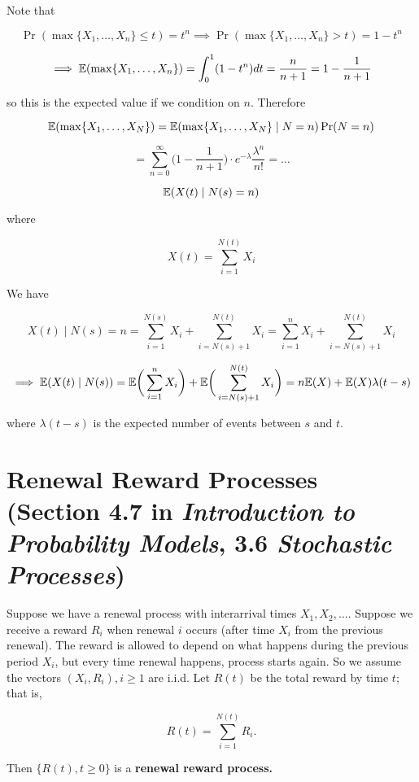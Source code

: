 \begin{solution} Note that 

\[
 \Pr(\max\{X_1, \ldots, X_n\} \leq t) = t^n \implies  \Pr(\max\{X_1, \ldots, X_n\} > t) = 1 - t^n
\]

\[
\implies \mathbb{E}(\max\{X_1, \ldots, X_n\}) = \int_0^1 (1 - t^n ) dt = \frac{n}{n+1} = 1 - \frac{1}{n+1}
\]

so this is the expected value if we condition on \(n\). Therefore

\[
\mathbb{E}( \max\{X_1, \ldots, X_N\}) = \mathbb{E}( \max\{X_1, \ldots, X_N\} \mid N = n) \Pr(N = n) 
\]

\[
=\sum_{n=0}^\infty  \bigg( 1 - \frac{1}{n+1} \bigg) \cdot e^{-\lambda} \frac{\lambda^n}{n!} = \ldots
\]

\end{solution}

\begin{exercise}

\[
\mathbb{E}(X(t) \mid N(s) = n)
\]

where

%

\[
X(t) = \sum_{i=1}^{N(t)} X_i
\]

\end{exercise}

\begin{solution}

We have

\[
X(t) \mid N(s) = n =   \sum_{i=1}^{N(s)} X_i  + \sum_{i=N(s) + 1}^{N(t)} X_i =   \sum_{i=1}^{n} X_i  + \sum_{i=N(s) + 1}^{N(t)} X_i
\]

\[
\implies \mathbb{E}(X(t) \mid N(s)) = \mathbb{E} \bigg(  \sum_{i=1}^{n} X_i  \bigg) + \mathbb{E} \bigg( \sum_{i=N(s) + 1}^{N(t)} X_i \bigg)  = n \mathbb{E}(X) + \mathbb{E} (X) \lambda(t-s)
\]

where \(\lambda(t-s)\) is the expected number of events between \(s\) and \(t\).

\end{solution}

\section{Renewal Reward Processes (Section 4.7 in \textit{Introduction to Probability Models}, 3.6 \textit{Stochastic Processes})}

\begin{definition}Suppose we have a renewal process with interarrival times \(X_1, X_2, \ldots\). Suppose we receive a reward \(R_i\) when renewal \(i\) occurs (after time \(X_i\) from the previous renewal). The reward is allowed to depend on what happens during the previous period \(X_i\), but every time renewal happens, process starts again. So we assume the vectors \((X_i, R_i), i \geq 1\) are i.i.d. Let \(R(t)\) be the total reward by time \(t\); that is,

\[
R(t) = \sum_{i=1}^{N(t)} R_i.
\]

Then \(\{R(t), t \geq 0\}\) is a \textbf{renewal reward process.}

\end{definition}

